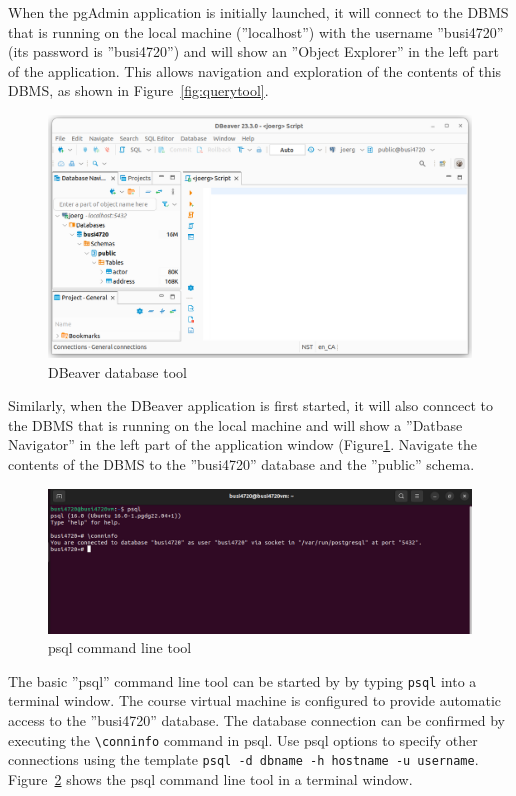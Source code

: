 When the pgAdmin application is initially launched, it will connect to the DBMS that is running on the local machine (''localhost'') with the username ''busi4720'' (its password is ''busi4720'') and will show an ''Object Explorer'' in the left part of the application. This allows navigation and exploration of the contents of this DBMS, as shown in Figure~\ref{fig:querytool}.

\begin{figure}
\centering
\includegraphics[width=.9\textwidth]{screen4.png}
\caption{DBeaver database tool}
\label{fig:dbeaver}
\end{figure}

Similarly, when the DBeaver application is first started, it will also conncect to the DBMS that is running on the local machine and will show a ''Datbase Navigator'' in the left part of the application window (Figure\ref{fig:dbeaver}. Navigate the contents of the DBMS to the ''busi4720'' database and the ''public'' schema.

\begin{figure}
\centering
\includegraphics[width=.9\textwidth]{screen3.png}
\caption{psql command line tool}
\label{fig:psql}
\end{figure}

The basic ''psql'' command line tool can be started by by typing \texttt{psql} into a terminal window. The course virtual machine is configured to provide automatic access to the ''busi4720'' database. The database connection can be confirmed by executing the \texttt{\textbackslash conninfo} command in psql. Use psql options to specify other connections using the template \texttt{psql -d dbname -h hostname -u username}. Figure~\ref{fig:psql} shows the psql command line tool in a terminal window.

